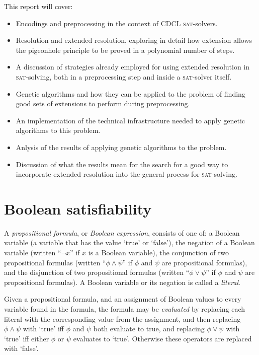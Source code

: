 \documentclass[proof,pdftex,11pt,a4,titlepage]{article}
\newcommand{\sat}{\textsc{sat}}
\begin{document}
This report will cover:
\begin{itemize}
  \item Encodings and preprocessing in the context of CDCL \sat{}-solvers.
  \item Resolution and extended resolution, exploring in detail how extension allows the pigeonhole principle to be proved in a polynomial number of steps.
  \item A discussion of strategies already employed for using extended resolution in \sat{}-solving, both in a preprocessing step and inside a \sat{}-solver itself.
  \item Genetic algorithms and how they can be applied to the problem of finding good sets of extensions to perform during preprocessing.
  \item An implementation of the technical infrastructure needed to apply genetic algorithms to this problem.
  \item Anlysis of the results of applying genetic algorithms to the problem.
  \item Discussion of what the results mean for the search for a good way to incorporate extended resolution into the general process for \sat{}-solving.
\end{itemize}

\section{Boolean satisfiability}

A \emph{propositional formula}, or \emph{Boolean expression}, consists of one of: a Boolean variable (a variable that has the value `true' or `false'), the negation of a Boolean variable (written ``$\neg x$'' if $x$ is a Boolean variable), the conjunction of two propositional formulas (written ``$\phi \wedge \psi$'' if $\phi$ and $\psi$ are propositional formulas), and the disjunction of two propositional formulas (written ``$\phi \vee \psi$'' if $\phi$ and $\psi$ are propositional formulas). A Boolean variable or its negation is called a \emph{literal}.

Given a propositional formula, and an assignment of Boolean values to every variable found in the formula, the formula may be \emph{evaluated} by replacing each literal with the corresponding value from the assignment, and then replacing $\phi \wedge \psi$ with `true' iff $\phi$ and $\psi$ both evaluate to true, and replacing $\phi \vee \psi$ with `true' iff either $\phi$ or $\psi$ evaluates to `true'. Otherwise these operators are replaced with `false'.
\end{document}
